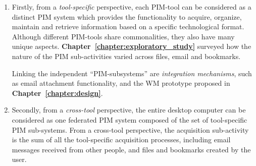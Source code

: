 \begin{enumerate}

\item Firstly, from a \textit{tool-specific} perspective, each PIM-tool can be considered as a distinct PIM system which provides the functionality to acquire, organize, maintain and retrieve information based on a specific technological format. Although different PIM-tools share commonalities, they also have many unique aspects. \textbf{Chapter~\ref{chapter:exploratory_study}} surveyed how the nature of the PIM sub-activities varied across files, email and bookmarks. %

Linking the independent ``PIM-subsystems'' are \textit{integration mechanisms}, such as email attachment functionality, and the WM prototype proposed in \textbf{Chapter~\ref{chapter:design}}.

\item Secondly, from a \textit{cross-tool} perspective, the entire desktop computer can be considered as one federated PIM system composed of the set of tool-specific PIM sub-systems.  From a cross-tool perspective, the acquisition sub-activity is the sum of all the tool-specific acquisition processes, including email messages received from other people, and files and bookmarks created by the user.

\end{enumerate}  


